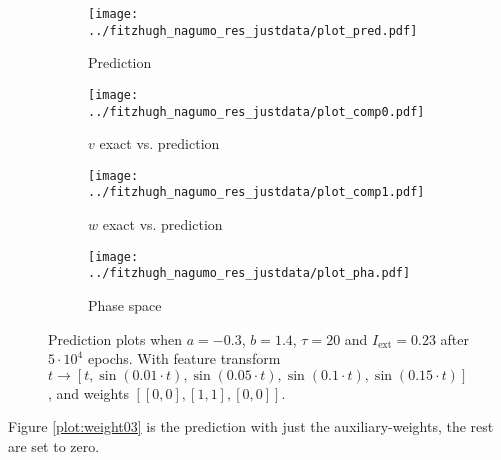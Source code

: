 \documentclass[a4paper]{article}
\begin{document}
\begin{figure}[H]
	\centering 
	\begin{subfigure}[b]{0.47\textwidth}
		\centering
		\texttt{[image: ../fitzhugh\_nagumo\_res\_justdata/plot\_pred.pdf]}
		\caption{Prediction}
		\label{fig:weight02a}
	\end{subfigure}
	\begin{subfigure}[b]{0.47\textwidth}
		\centering
		\texttt{[image: ../fitzhugh\_nagumo\_res\_justdata/plot\_comp0.pdf]}
		\caption{$v$ exact vs. prediction}
		\label{fig:weight02b}
	\end{subfigure}
	\begin{subfigure}[b]{0.47\textwidth}
		\centering
		\texttt{[image: ../fitzhugh\_nagumo\_res\_justdata/plot\_comp1.pdf]}
		\caption{$w$ exact vs. prediction}
		\label{fig:weight02c}
	\end{subfigure}
	\begin{subfigure}[b]{0.47\textwidth}
		\centering
		\texttt{[image: ../fitzhugh\_nagumo\_res\_justdata/plot\_pha.pdf]}
		\caption{Phase space}
		\label{fig:weight02d}
	\end{subfigure}
	\caption{Prediction plots when $a=-0.3$, $b=1.4$, $\tau=20$ and $ I_{\text{ext}}=0.23$ after $5\cdot10^4$ epochs. With feature transform $t \rightarrow \left[ t, \sin(0.01 \cdot  t), \sin(0.05 \cdot  t), \sin(0.1 \cdot  t), \sin(0.15 \cdot  t)\right] $, and weights $\left[ \left[ 0, 0\right], \left[ 1, 1\right], \left[ 0, 0\right]\right]$.}
	\label{plot:weight02}
\end{figure}

Figure \ref{plot:weight03} is the prediction with just the auxiliary-weights, the rest are set to zero.
\end{document}
